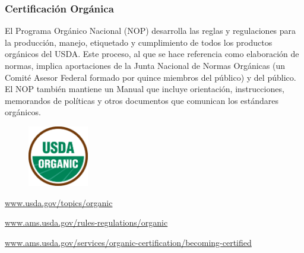 \documentclass{article}
\begin{document}
\subsubsection{Certificación Orgánica}

El Programa Orgánico Nacional (NOP) desarrolla las reglas y regulaciones para la producción, manejo, etiquetado y cumplimiento de todos los productos orgánicos del USDA. Este proceso, al que se hace referencia como elaboración de normas, implica aportaciones de la Junta Nacional de Normas Orgánicas (un Comité Asesor Federal formado por quince miembros del público) y del público. El NOP también mantiene un Manual que incluye orientación, instrucciones, memorandos de políticas y otros documentos que comunican los estándares orgánicos.

\begin{figure}[H]
	\includegraphics[width=100px]{res/usa-organic.png}
	\label{fig:usaorgnic}
\end{figure}

\url{www.usda.gov/topics/organic}

\url{www.ams.usda.gov/rules-regulations/organic}

\url{www.ams.usda.gov/services/organic-certification/becoming-certified}
\end{document}
